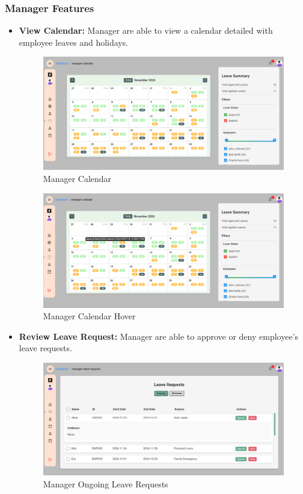 \documentclass[a4paper,12pt, oneside]{report}
\begin{document}
\subsubsection{Manager Features}
\label{subsubsec:ManagerFeatures}
\begin{itemize}

    \item \textbf{View Calendar:} Manager are able to view a calendar detailed with employee leaves and holidays.

    \begin{figure}[H]
        \centering
        \includegraphics[width=0.8\linewidth]{ManagerPages/ManagerCalendar.png}
        \caption{Manager Calendar}
        \label{fig:manager-calendar}
    \end{figure}
    \begin{figure}[H]
        \centering
        \includegraphics[width=0.8\linewidth]{ManagerPages/ManagerCalendar2.png}
        \caption{Manager Calendar Hover}
        \label{fig:manager-calendar-h}
    \end{figure}
    
    \item \textbf{Review Leave Request:} Manager are able to approve or deny employee's leave requests.

    \begin{figure}[H]
    \centering
    \includegraphics[width=0.8\columnwidth]{ManagerPages/ManagerLeaveRequest.png}
    \caption{Manager Ongoing Leave Requests}
    \label{fig:manager-on-leave-request}
    \end{figure}


\end{itemize}
\end{document}
